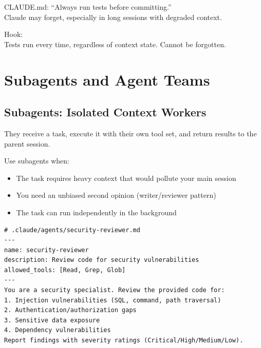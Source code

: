 \begin{warnbox}
CLAUDE.md: ``Always run tests before committing.'' \\
Claude may forget, especially in long sessions with degraded context.

Hook:  \\
Tests run every time, regardless of context state. Cannot be forgotten.
\end{warnbox}

\section{Subagents and Agent Teams}
\label{sec:agents}

\subsection{Subagents: Isolated Context Workers}


They receive a task, execute it with their own tool set, and return results
to the parent session.

Use subagents when:
\begin{itemize}
  \item The task requires heavy context that would pollute your main session
  \item You need an unbiased second opinion (writer/reviewer pattern)
  \item The task can run independently in the background
\end{itemize}

\begin{verbatim}
# .claude/agents/security-reviewer.md
---
name: security-reviewer
description: Review code for security vulnerabilities
allowed_tools: [Read, Grep, Glob]
---
You are a security specialist. Review the provided code for:
1. Injection vulnerabilities (SQL, command, path traversal)
2. Authentication/authorization gaps
3. Sensitive data exposure
4. Dependency vulnerabilities
Report findings with severity ratings (Critical/High/Medium/Low).
\end{verbatim}

